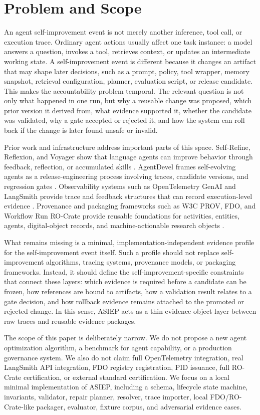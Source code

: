 \section{Problem and Scope}

An agent self-improvement event is not merely another inference, tool call, or execution trace. Ordinary agent actions usually affect one task instance: a model answers a question, invokes a tool, retrieves context, or updates an intermediate working state. A self-improvement event is different because it changes an artifact that may shape later decisions, such as a prompt, policy, tool wrapper, memory snapshot, retrieval configuration, planner, evaluation script, or release candidate. This makes the accountability problem temporal. The relevant question is not only what happened in one run, but why a reusable change was proposed, which prior version it derived from, what evidence supported it, whether the candidate was validated, why a gate accepted or rejected it, and how the system can roll back if the change is later found unsafe or invalid.

Prior work and infrastructure address important parts of this space. Self-Refine, Reflexion, and Voyager show that language agents can improve behavior through feedback, reflection, or accumulated skills \cite{self_refine_2023,reflexion_2023,voyager_2023}. AgentDevel frames self-evolving agents as a release-engineering process involving traces, candidate versions, and regression gates \cite{agentdevel_2026}. Observability systems such as OpenTelemetry GenAI and LangSmith provide trace and feedback structures that can record execution-level evidence \cite{otel_genai_semconv,langsmith_observability_concepts}. Provenance and packaging frameworks such as W3C PROV, FDO, and Workflow Run RO-Crate provide reusable foundations for activities, entities, agents, digital-object records, and machine-actionable research objects \cite{w3c_prov_dm,fdo_architecture_spec,workflow_run_rocrate}.

What remains missing is a minimal, implementation-independent evidence profile for the self-improvement event itself. Such a profile should not replace self-improvement algorithms, tracing systems, provenance models, or packaging frameworks. Instead, it should define the self-improvement-specific constraints that connect these layers: which evidence is required before a candidate can be frozen, how references are bound to artifacts, how a validation result relates to a gate decision, and how rollback evidence remains attached to the promoted or rejected change. In this sense, ASIEP acts as a thin evidence-object layer between raw traces and reusable evidence packages.

The scope of this paper is deliberately narrow. We do not propose a new agent optimization algorithm, a benchmark for agent capability, or a production governance system. We also do not claim full OpenTelemetry integration, real LangSmith API integration, FDO registry registration, PID issuance, full RO-Crate certification, or external standard certification. We focus on a local minimal implementation of ASIEP, including a schema, lifecycle state machine, invariants, validator, repair planner, resolver, trace importer, local FDO/RO-Crate-like packager, evaluator, fixture corpus, and adversarial evidence cases.
